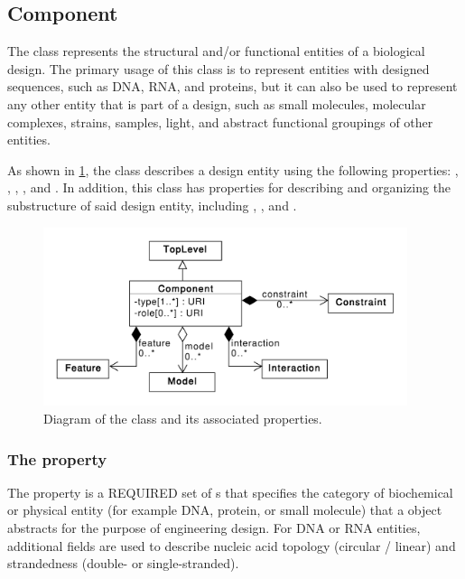 \subsection{Component}
\label{sec:Component}

The  class represents the structural and/or functional entities of a biological design. The primary usage of this class is to represent entities with designed sequences, such as DNA, RNA, and proteins, but it can also be used to represent any other entity that is part of a design, such as small molecules, molecular complexes, strains, samples, light, and abstract functional groupings of other entities.

As shown in \ref{uml:component}, the  class describes a design entity using the following properties: , , , , and . 
In addition, this class has properties for describing and organizing the substructure of said design entity, including , , and .

\begin{figure}[ht]
\begin{center}
\includegraphics[width=0.95\textwidth]{uml/component}
\caption[]{Diagram of the  class and its associated properties.}
\label{uml:component}
\end{center}
\end{figure} 

\subsubsection*{The  property}
\label{sec:types:CD}

The  property is a REQUIRED set of s that
specifies the category of biochemical or physical entity (for example DNA,
protein, or small molecule) that a  object abstracts
for the purpose of engineering design. For DNA or RNA entities,
additional  fields are used to describe nucleic acid
topology (circular / linear) and strandedness (double- or single-stranded).

